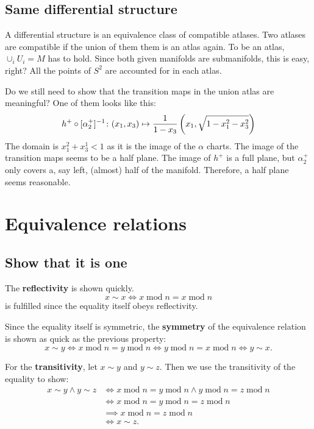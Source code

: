 \documentclass[11pt, english, fleqn, DIV=15, headinclude, BCOR=1cm]{scrartcl}
\begin{document}
\subsection{Same differential structure}

A differential structure is an equivalence class of compatible atlases. Two
atlases are compatible if the union of them them is an atlas again. To be an
atlas, $\cup_i U_i = M$ has to hold. Since both given manifolds are
submanifolds, this is easy, right? All the points of $S^2$ are accounted for in
each atlas.

Do we still need to show that the transition maps in the union atlas are
meaningful? One of them looks like this:
\[
    h^+ \circ [\alpha_2^+]^{-1} \colon
    (x_1, x_3) \mapsto \frac{1}{1-x_3} \left( x_1, \sqrt{1 - x_1^2 - x_3^2} \right)
\]
The domain is $x_1^2 + x_3^1 < 1$ as it is the image of the $\alpha$ charts.
The image of the transition maps seems to be a half plane. The image of $h^+$
is a full plane, but $\alpha_2^+$ only covers a, say left, (almost) half of the
manifold. Therefore, a half plane seems reasonable.

\section{Equivalence relations}

\subsection{Show that it is one}

\renewcommand\mod{\operatorname{mod}}

The \textbf{reflectivity} is shown quickly.
\[
    x \sim x \iff x \mod n = x \mod n
\]
is fulfilled since the equality itself obeys reflectivity.

Since the equality itself is symmetric, the \textbf{symmetry} of the
equivalence relation is shown as quick as the previous property:
\[
    x \sim y
    \iff
    x \mod n = y \mod n
    \iff
    y \mod n = x \mod n
    \iff
    y \sim x.
\]

For the \textbf{transitivity}, let $x \sim y$ and $y \sim z$. Then we use the
transitivity of the equality to show:
\begin{align*}
    x \sim y \land y \sim z
    &\iff
    x \mod n = y \mod n
    \land
    y \mod n = z \mod n \\
    &\iff
    x \mod n = y \mod n = z \mod n \\
    &\implies
    x \mod n = z \mod n \\
    &\iff
    x \sim z.
\end{align*}
\end{document}
